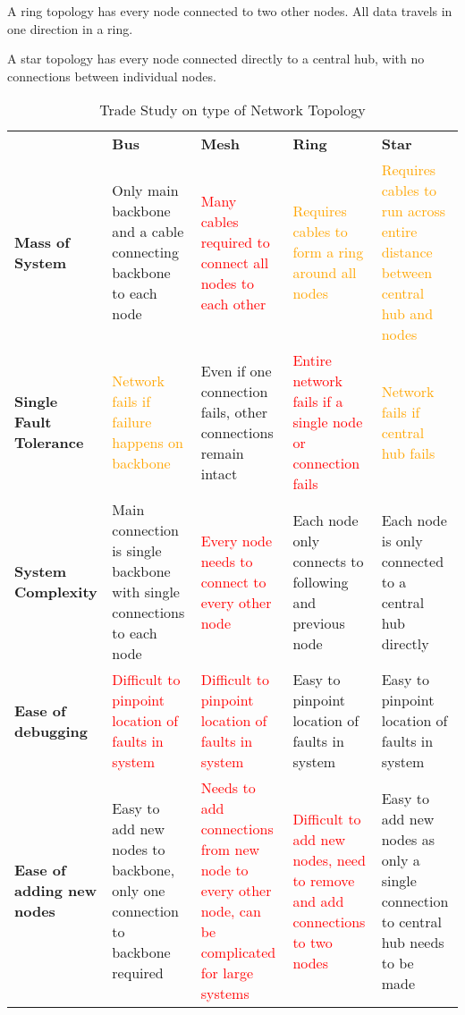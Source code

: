 A ring topology has every node connected to two other nodes. All data travels in one direction in a ring.

A star topology has every node connected directly to a central hub, with no connections between individual nodes.
\begin{table}[H]
\centering
\caption[Trade Study on type of Network Topology]{Trade Study on type of Network Topology\cite{studytopology}\cite{topology_intro}}
\begin{tabular}{|P{2.5cm}|P{3cm}|P{3cm}|P{3cm}|P{2.9cm}|}
\hline
	&	\textbf{Bus}	&	\textbf{Mesh}	&	\textbf{Ring}	&	\textbf{Star}	\\\hhline{|=|=|=|=|=|}
\textbf{Mass of System}	&
\textcolor{OliveGreen}{Only main backbone and a cable connecting backbone to each node}	&
\textcolor{red}{Many cables required to connect all nodes to each other}	&
\textcolor{orange}{Requires cables to form a ring around all nodes}	&
\textcolor{orange}{Requires cables to run across entire distance between central hub and nodes}	\\\hline
\textbf{Single Fault Tolerance}	&
\textcolor{orange}{Network fails if failure happens on backbone}	&
\textcolor{OliveGreen}{Even if one connection fails, other connections remain intact}	&
\textcolor{red}{Entire network fails if a single node or connection fails}	&
\textcolor{orange}{Network fails if central hub fails}	\\\hline
\textbf{System Complexity}	&
\textcolor{OliveGreen}{Main connection is single backbone with single connections to each node}	&
\textcolor{red}{Every node needs to connect to every other node}	&
\textcolor{OliveGreen}{Each node only connects to following and previous node}	&
\textcolor{OliveGreen}{Each node is only connected to a central hub directly}	\\\hline
\textbf{Ease of debugging}	&
\textcolor{red}{Difficult to pinpoint location of faults in system}	&
\textcolor{red}{Difficult to pinpoint location of faults in system}	&	
\textcolor{OliveGreen}{Easy to pinpoint location of faults in system}	&	
\textcolor{OliveGreen}{Easy to pinpoint location of faults in system}	\\\hline
\textbf{Ease of adding new nodes}	&
\textcolor{OliveGreen}{Easy to add new nodes to backbone, only one connection to backbone required}	&
\textcolor{red}{Needs to add connections from new node to every other node, can be complicated for large systems}	&
\textcolor{red}{Difficult to add new nodes, need to remove and add connections to two nodes}	&
\textcolor{OliveGreen}{Easy to add new nodes as only a single connection to central hub needs to be made}	\\\hline
\end{tabular}
\label{tab:networkto}
\end{table}
